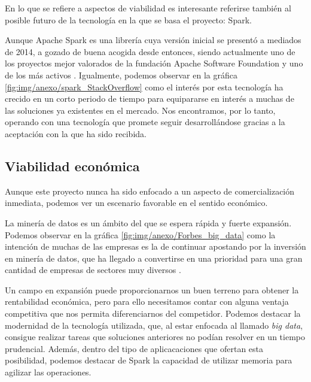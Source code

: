 En lo que se refiere a aspectos de viabilidad es interesante referirse también al posible futuro de la tecnología en la que se basa el proyecto: Spark.

Aunque Apache Spark es una librería cuya versión inicial se presentó a mediados de 2014, a gozado de buena acogida desde entonces, siendo actualmente uno de los proyectos mejor valorados de la fundación Apache Software Foundation y uno de los más activos \cite{ApacheContributions}. Igualmente, podemos observar en la gráfica \ref{fig:img/anexo/spark_StackOverflow} como el interés por esta tecnología ha crecido en un corto periodo de tiempo para equipararse en interés a muchas de las soluciones ya existentes en el mercado. Nos encontramos, por lo tanto, operando con una tecnología que promete seguir desarrollándose gracias a la aceptación con la que ha sido recibida.



\subsection{Viabilidad económica}

Aunque este proyecto nunca ha sido enfocado a un aspecto de comercialización inmediata, podemos ver un escenario favorable en el sentido económico.

La minería de datos es un ámbito del que se espera rápida y fuerte expansión. Podemos observar en la gráfica \ref{fig:img/anexo/Forbes_big_data} como la intención de muchas de las empresas es la de continuar apostando por la inversión en minería de datos, que ha llegado a convertirse en una prioridad para una gran cantidad de empresas de sectores muy diversos \cite{forbesBigData}.


Un campo en expansión puede proporcionarnos un buen terreno para obtener la rentabilidad económica, pero para ello necesitamos contar con alguna ventaja competitiva que nos permita diferenciarnos del competidor. Podemos destacar la modernidad de la tecnología utilizada, que, al estar enfocada al llamado \textit{big data}, consigue realizar tareas que soluciones anteriores no podían resolver en un tiempo prudencial. Además, dentro del tipo de aplicacaciones que ofertan esta posibilidad, podemos destacar de Spark la capacidad de utilizar memoria para agilizar las operaciones.

